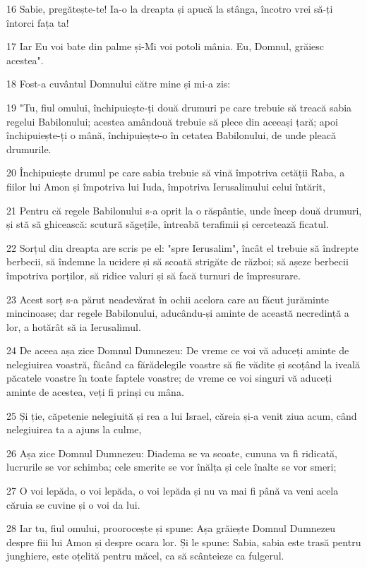 \par 16 Sabie, pregătește-te! Ia-o la dreapta și apucă la stânga, încotro vrei să-ți întorci fața ta!
\par 17 Iar Eu voi bate din palme și-Mi voi potoli mânia. Eu, Domnul, grăiesc acestea".
\par 18 Fost-a cuvântul Domnului către mine și mi-a zis:
\par 19 "Tu, fiul omului, închipuiește-ți două drumuri pe care trebuie să treacă sabia regelui Babilonului; acestea amândouă trebuie să plece din aceeași țară; apoi închipuiește-ți o mână, închipuiește-o în cetatea Babilonului, de unde pleacă drumurile.
\par 20 Închipuiește drumul pe care sabia trebuie să vină împotriva cetății Raba, a fiilor lui Amon și împotriva lui Iuda, împotriva Ierusalimului celui întărit,
\par 21 Pentru că regele Babilonului s-a oprit la o răspântie, unde încep două drumuri, și stă să ghicească: scutură săgețile, întreabă terafimii și cercetează ficatul.
\par 22 Sorțul din dreapta are scris pe el: "spre Ierusalim", încât el trebuie să îndrepte berbecii, să îndemne la ucidere și să scoată strigăte de război; să așeze berbecii împotriva porților, să ridice valuri și să facă turnuri de împresurare.
\par 23 Acest sorț s-a părut neadevărat în ochii acelora care au făcut jurăminte mincinoase; dar regele Babilonului, aducându-și aminte de această necredință a lor, a hotărât să ia Ierusalimul.
\par 24 De aceea așa zice Domnul Dumnezeu: De vreme ce voi vă aduceți aminte de nelegiuirea voastră, făcând ca fărădelegile voastre să fie vădite și scoțând la iveală păcatele voastre în toate faptele voastre; de vreme ce voi singuri vă aduceți aminte de acestea, veți fi prinși cu mâna.
\par 25 Și ție, căpetenie nelegiuită și rea a lui Israel, căreia și-a venit ziua acum, când nelegiuirea ta a ajuns la culme,
\par 26 Așa zice Domnul Dumnezeu: Diadema se va scoate, cununa va fi ridicată, lucrurile se vor schimba; cele smerite se vor înălța și cele înalte se vor smeri;
\par 27 O voi lepăda, o voi lepăda, o voi lepăda și nu va mai fi până va veni acela căruia se cuvine și o voi da lui.
\par 28 Iar tu, fiul omului, proorocește și spune: Așa grăiește Domnul Dumnezeu despre fiii lui Amon și despre ocara lor. Și le spune: Sabia, sabia este trasă pentru junghiere, este oțelită pentru măcel, ca să scânteieze ca fulgerul.
